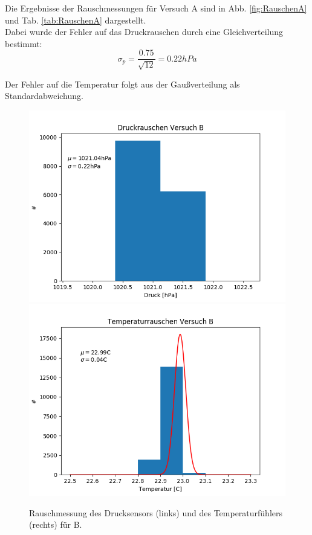 \documentclass[12pt,a4paper]{article}
\begin{document}
Die Ergebnisse der Rauschmessungen für Versuch A sind in Abb. \ref{fig:RauschenA} und Tab. \ref{tab:RauschenA} dargestellt.\\
Dabei wurde der Fehler auf das Druckrauschen durch eine Gleichverteilung bestimmt:
\begin{equation}
\sigma_p =\dfrac{0.75}{\sqrt{12}} = 0.22hPa
\end{equation}

Der Fehler auf die Temperatur folgt aus der Gaußverteilung als Standardabweichung.






\begin{figure}[H]
\includegraphics[scale=0.5]{Bilder/DruckrauschenB}
\includegraphics[scale=0.5]{Bilder/TemprauschenB}
\caption[Rauschmessung Versuch B]{Rauschmessung des Drucksensors (links) und des Temperaturfühlers (rechts) für B.}
\label{fig:RauschenB}
\end{figure}
\end{document}

